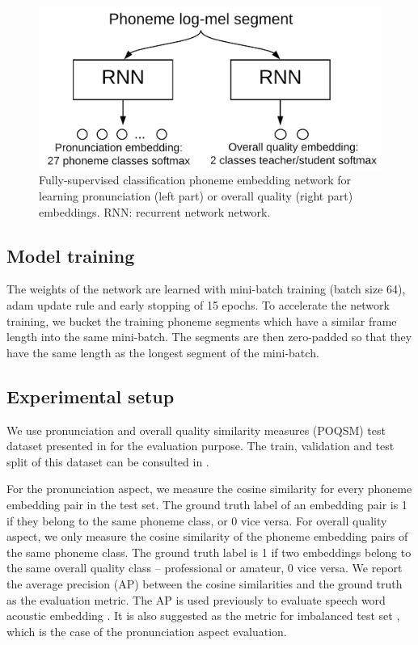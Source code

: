\begin{figure}[ht!]
    \centering
    \includegraphics[width=\textwidth]{figs/ch7/classification_net.png}
    \caption{Fully-supervised classification phoneme embedding network for learning pronunciation (left part) or overall quality (right part) embeddings. RNN: recurrent network network.}
    \label{fig:ch7:classification_net}
\end{figure}

\subsection{Model training}

The weights of the network are learned with mini-batch training (batch size 64), adam \cite{kingma2014adam} update rule and early stopping of 15 epochs. To accelerate the network training, we bucket the training phoneme segments which have a similar frame length into the same mini-batch. The segments are then zero-padded so that they have the same length as the longest segment of the mini-batch. 

\subsection{Experimental setup}\label{sec:ch7:experimental_setup_classification}

We use pronunciation and overall quality similarity measures (POQSM) test dataset presented in  for the evaluation purpose. The train, validation and test split of this dataset can be consulted in .

For the pronunciation aspect, we measure the cosine similarity for every phoneme embedding pair in the test set. The ground truth label of an embedding pair is 1 if they belong to the same phoneme class, or 0 vice versa. For overall quality aspect, we only measure the cosine similarity of the phoneme embedding pairs of the same phoneme class. The ground truth label is 1 if two embeddings belong to the same overall quality class -- professional or amateur, 0 vice versa. We report the average precision (AP) between the cosine similarities and the ground truth as the evaluation metric. The AP is used previously to evaluate speech word acoustic embedding \cite{Kampera,Settle2016a}. It is also suggested as the metric for imbalanced test set \cite{Davis2006}, which is the case of the pronunciation aspect evaluation.

